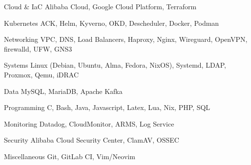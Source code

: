 

\begin{cvskills}

  \cvskill
    {Cloud \& IaC} %
    {Alibaba Cloud, Google Cloud Platform, Terraform} %

  \cvskill
    {Kubernetes} %
    {ACK, Helm, Kyverno, OKD, Descheduler, Docker, Podman} %

  \cvskill
    {Networking} %
    {VPC, DNS, Load Balancers, Haproxy, Nginx, Wireguard, OpenVPN,
    firewalld, UFW, GNS3} %

  \cvskill
    {Systems} %
    {Linux (Debian, Ubuntu, Alma, Fedora, NixOS), Systemd, LDAP,
    Proxmox, Qemu, iDRAC} %

  \cvskill
    {Data} %
    {MySQL, MariaDB, Apache Kafka} %

  \cvskill
    {Programming} %
    {C, Bash, Java, Javascript, Latex, Lua, Nix, PHP, SQL} %

  \cvskill
    {Monitoring} %
    {Datadog, CloudMonitor, ARMS, Log Service} %

  \cvskill
    {Security} %
    {Alibaba Cloud Security Center, ClamAV, OSSEC} %

  \cvskill
    {Miscellaneous} %
    {Git, GitLab CI, Vim/Neovim} %

\end{cvskills}
